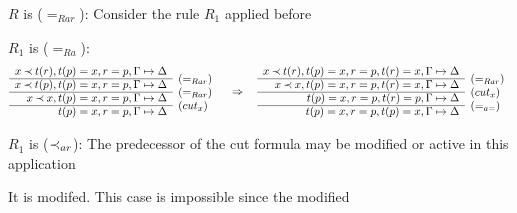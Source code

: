\begin{PROOF}
\begin{LS}
%
\item $R$ is ($=_{Rar}$):
Consider the rule $R_1$ applied before
\begin{LSA}
\item $R_1$ is ($=_{Ra}$):
{\scriptsize \[ \begin{array}{rl}
x\Incl t(r), t(p)=x, r=p,\GSD  \\ \cline{1-1}
x\Incl t(p), t(p)=x, r=p, \GSD & \rabove{(=_{Rar})} \\ \cline{1-1}
x\Incl x,  t(p)=x, r=p, \GSD & \rabove{(=_{Rar})} \\ \cline{1-1}
           t(p)=x, r=p,\GSD & \rabove{(cut_x)} \end{array}  \conv 
 \begin{array}{rl}
x\Incl t(r), t(p)=x, r=p, t(r)=x,\GSD  \\ \cline{1-1}
x\Incl x, t(p)=x, r=p, t(r)=x,\GSD & \rabove{(=_{Rar})} \\ \cline{1-1}
   t(p)=x, r=p, t(r)=p,\GSD & \rabove{(cut_x)} \\ \cline{1-1}
           t(p)=x, r=p, t(p)=x, \GSD & \rabove{(=_{a=})} \end{array} \] }
\item $R_1$ is ($\mathbin{\prec}_{ar}$):
The predecessor of the cut formula may be modified or active in this application
\begin{LSB}
 \item\label{it:modIncl} It is modifed. This case is impossible since the modified

\end{LSB}
\end{LSA}
\end{LS}
\end{PROOF}
